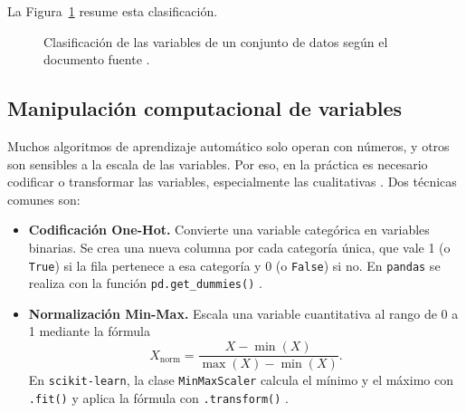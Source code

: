 \documentclass[11pt,letterpaper]{article}
\begin{document}
La Figura~\ref{fig:tipos} resume esta clasificación.

\begin{figure}[htbp]
\centering
{}
\caption{Clasificación de las variables de un conjunto de datos según el documento fuente \parencite{tecnm2026_documento_fuente}.}
\label{fig:tipos}
\end{figure}

\subsection{Manipulación computacional de variables}

Muchos algoritmos de aprendizaje automático solo operan con números, y otros son sensibles a la escala de las variables. Por eso, en la práctica es necesario codificar o transformar las variables, especialmente las cualitativas \parencite{tecnm2026_documento_fuente}. Dos técnicas comunes son:

\begin{itemize}
    \item \textbf{Codificación One-Hot.} Convierte una variable categórica en variables binarias. Se crea una nueva columna por cada categoría única, que vale 1 (o \texttt{True}) si la fila pertenece a esa categoría y 0 (o \texttt{False}) si no. En \texttt{pandas} se realiza con la función \texttt{pd.get\_dummies()} \parencite{tecnm2026_documento_fuente,bruce2020}.
    \item \textbf{Normalización Min-Max.} Escala una variable cuantitativa al rango de 0 a 1 mediante la fórmula
    \begin{equation}
        X_{\text{norm}} = \frac{X - \min(X)}{\max(X) - \min(X)}.
        \label{eq:minmax}
    \end{equation}
    En \texttt{scikit-learn}, la clase \texttt{MinMaxScaler} calcula el mínimo y el máximo con \texttt{.fit()} y aplica la fórmula con \texttt{.transform()} \parencite{tecnm2026_documento_fuente}.
\end{itemize}
\end{document}
